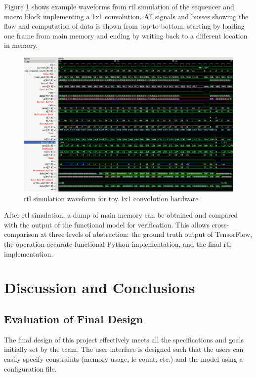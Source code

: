 \documentclass{uw-ece-wkrpt}
\begin{document}
Figure \ref{fig:rtl_simulation_waveform} shows example waveforms from \gls{rtl} simulation of the sequencer and macro block implementing a 1x1 convolution. All signals and busses showing the flow and computation of data is shown from top-to-bottom, starting by loading one frame from main memory and ending by writing back to a different location in memory.

\begin{figure}
\centering
\includegraphics[width=\textwidth]{figures/rtl_simulation_waveform}
\caption{\Gls{rtl} simulation waveform for toy 1x1 convolution hardware}\label{fig:rtl_simulation_waveform}
\end{figure}

After \gls{rtl} simulation, a dump of main memory can be obtained and compared with the output of the functional model for verification. This allows cross-comparison at three levels of abstraction: the ground truth output of TensorFlow, the operation-accurate functional Python implementation, and the final \gls{rtl} implementation.

\section{Discussion and Conclusions}

\subsection{Evaluation of Final Design}

The final design of this project effectively meets all the specifications and goals initially set by the team. The user interface is designed such that the users can easily specify constraints (memory usage, \gls{le} count, etc.) and the model using a configuration file.
\end{document}
